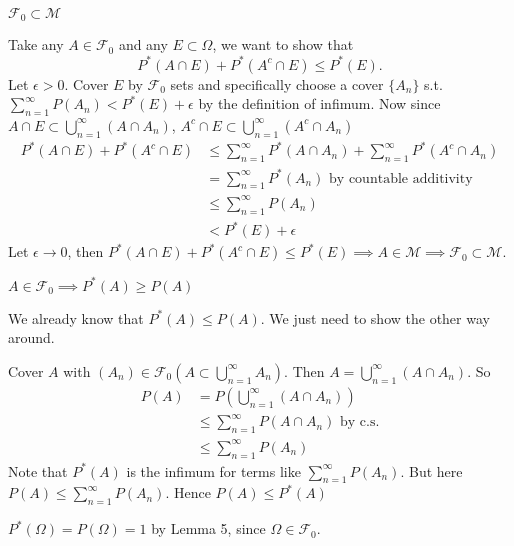 \documentclass[class=article,crop=false]{standalone}
\begin{document}
\begin{lem}[4]
$\mathcal{F}_0 \subset \mathcal{M}$
\end{lem}
\begin{prf}
	Take any $A \in \mathcal{F}_0$ and any $E \subset \Omega$, we want to show that 
\[
	P^* (A \cap E) + P^* (A^{c} \cap  E) \leq P^* (E) 
.\]
Let $\epsilon>0$. Cover $E$ by  $\mathcal{F}_0$ sets and specifically choose a cover $\{A_n\} $ s.t. $\sum_{ n=1}^{\infty} P(A_n) < P^* (E) + \epsilon$ by the definition of infimum.
Now since $A \cap  E \subset \bigcup_{n= 1}^{\infty} (A \cap A_n)$, $A^{c} \cap  E \subset \bigcup_{n= 1}^{\infty} (A^{c} \cap  A_n)$
\begin{align*}
	P^* (A \cap E ) + P^* (A^{c} \cap  E) &\leq \sum_{ n=1}^{\infty} P^* (A \cap A_n) + \sum_{ n=1}^{\infty} P^* (A^{c} \cap A_n)  \\
					      &= \sum_{ n=1}^{\infty} P^* (A_n) \text{ by countable additivity} \\
					      &\leq \sum_{ n=1}^{\infty} P(A_n)\\
					      &< P^* (E) + \epsilon
\end{align*}
Let $\epsilon \to 0$, then $P^* (A \cap  E)+P^* (A^{c} \cap  E) \leq P^* (E) \implies A \in \mathcal{M} \implies \mathcal{F}_0 \subset \mathcal{M}$.
\end{prf}

\begin{lem}[5]
	$A \in \mathcal{F}_0 \implies P^* (A) \geq P(A)$
\end{lem}
\begin{prf}
	We already know that $P^* (A) \leq P(A)$. We just need to show the other way around.

	Cover $A$ with  $(A_n) \in \mathcal{F}_0 (A \subset \bigcup_{n= 1}^{\infty} A_n)$. Then $A = \bigcup_{n= 1}^{\infty} (A \cap A_n)$. So 
	\begin{align*}
		P(A)&=P\left( \bigcup_{n= 1}^{\infty} (A \cap  A_n) \right) \\
		    & \leq \sum_{ n=1}^{\infty} P(A \cap A_n) \text{ by c.s.} \\
		    & \leq \sum_{ n=1}^{\infty} P(A_n)
	\end{align*}
	Note that $P^* (A)$ is the infimum for terms like $\sum_{ n=1}^{\infty} P(A_n)$. But here $P(A) \leq \sum_{ n=1}^{\infty} P(A_n)$. Hence $P(A) \leq P^* (A)$
\end{prf}

\begin{remark}
	$P^* (\Omega) = P(\Omega) = 1$ by Lemma 5, since $\Omega \in \mathcal{F}_0$.
\end{remark}
\end{document}
